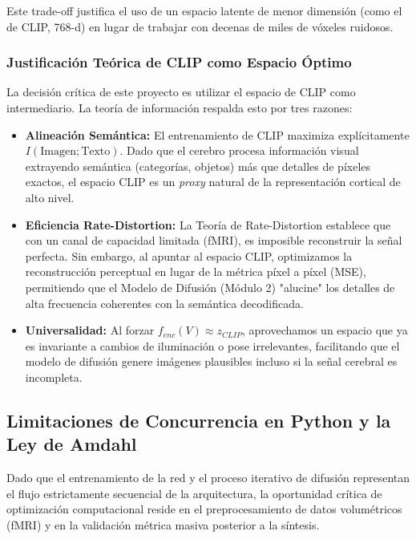 \documentclass{article}
\begin{document}
Este trade-off justifica el uso de un espacio latente de menor dimensión (como el de CLIP, 768-d) en lugar de trabajar con decenas de miles de vóxeles ruidosos.

\subsubsection{Justificación Teórica de CLIP como Espacio Óptimo}

La decisión crítica de este proyecto es utilizar el espacio de CLIP como intermediario. La teoría de información respalda esto por tres razones:

\begin{itemize}
    \item \textbf{Alineación Semántica:} El entrenamiento de CLIP maximiza explícitamente $I(\text{Imagen}; \text{Texto})$. Dado que el cerebro procesa información visual extrayendo semántica (categorías, objetos) más que detalles de píxeles exactos, el espacio CLIP es un \textit{proxy} natural de la representación cortical de alto nivel.
    
    \item \textbf{Eficiencia Rate-Distortion:} La Teoría de Rate-Distortion establece que con un canal de capacidad limitada (fMRI), es imposible reconstruir la señal perfecta. Sin embargo, al apuntar al espacio CLIP, optimizamos la reconstrucción perceptual en lugar de la métrica píxel a píxel (MSE), permitiendo que el Modelo de Difusión (Módulo 2) "alucine" los detalles de alta frecuencia coherentes con la semántica decodificada.
    
    \item \textbf{Universalidad:} Al forzar $f_{enc}(V) \approx z_{CLIP}$, aprovechamos un espacio que ya es invariante a cambios de iluminación o pose irrelevantes, facilitando que el modelo de difusión genere imágenes plausibles incluso si la señal cerebral es incompleta.
\end{itemize}

\subsection{Limitaciones de Concurrencia en Python y la Ley de Amdahl}
Dado que el entrenamiento de la red y el proceso iterativo de difusión representan el flujo estrictamente secuencial de la arquitectura, la oportunidad crítica de optimización computacional reside en el preprocesamiento de datos volumétricos (fMRI) y en la validación métrica masiva posterior a la síntesis. 
\end{document}
